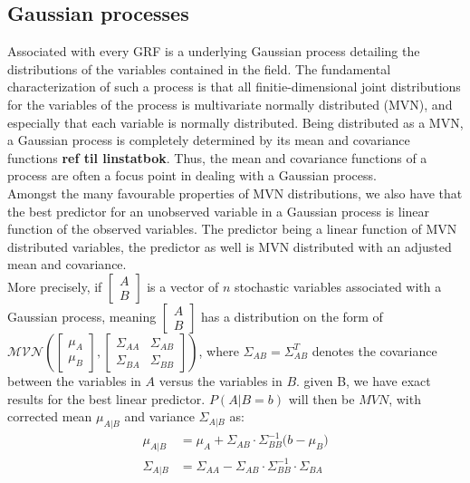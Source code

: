 \documentclass{article}
\begin{document}
\subsection{Gaussian processes} \label{sec:gaussian_processes}
Associated with every GRF is a underlying Gaussian process detailing the distributions of the variables contained in the field. The fundamental characterization of such a process is that all finitie-dimensional joint distributions for the variables of the process is multivariate normally distributed (MVN), and especially that each variable is normally distributed. Being distributed as a MVN, a Gaussian process is completely determined by its mean and covariance functions \textbf{ref til linstatbok}. Thus, the mean and covariance functions of a process are often a focus point in dealing with a Gaussian process. \\

Amongst the many favourable properties of MVN distributions, we also have that the best predictor for an unobserved variable in a Gaussian process is linear function of the observed variables. The predictor being a linear function of MVN distributed variables, the predictor as well is MVN distributed with an adjusted mean and covariance. \\ 

\indent More precisely, if $\begin{bmatrix} A \\ B \end{bmatrix}$ is a vector of $n$ stochastic variables associated with a Gaussian process, meaning $\begin{bmatrix} A \\ B \end{bmatrix}$ has a distribution on the form of $\mathcal{MVN}(\begin{bmatrix} \mu_A \\ \mu_B \end{bmatrix}, \begin{bmatrix} \Sigma_{AA} & \Sigma_{AB} \\ \Sigma_{BA} & \Sigma_{BB} \end{bmatrix})$, where $\Sigma_{AB} = \Sigma_{AB}^T$ denotes the covariance between the variables in $A$ versus the variables in $B$.  given B, we have exact results for the best linear predictor. $P(A | B = b)$ will then be $MVN$, with corrected mean $\mu_{A | B}$ and variance $\Sigma_{A | B}$ as:
\begin{align}
\mu_{A | B} &= \mu_A + \Sigma_{AB}\cdot \Sigma_{BB}^{-1}\big( b - \mu_B \big) \label{eq:gaussian_conditional_expectancy} \\
\Sigma_{A | B} &= \Sigma_{AA} - \Sigma_{AB} \cdot \Sigma_{BB}^{-1} \cdot \Sigma_{BA} \label{eq:gaussian_conditional_variance}
\end{align}
\end{document}
